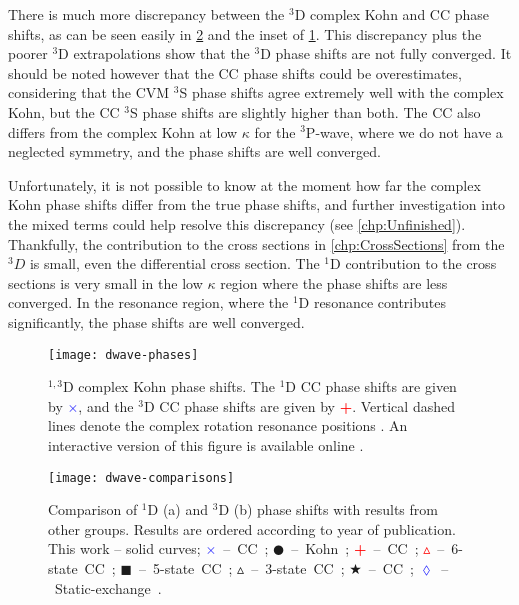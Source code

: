 \documentclass[Dissertation.tex]{subfiles}
\begin{document}
There is much more discrepancy between the $^3$D complex Kohn and CC phase
shifts, as can be seen easily in \cref{fig:DWaveComparisons} and the inset of
\cref{fig:DWavePhase}. This discrepancy
plus the poorer $^3$D extrapolations show that the $^3$D phase shifts are not
fully converged. It should be noted however that the CC phase shifts could be
overestimates, considering that the CVM \cite{Zhang2012} $^3$S phase shifts
agree extremely well with the complex Kohn, but the CC $^3$S phase shifts are
slightly higher than both. The CC also differs from the complex
Kohn at low $\kappa$ for the $^3$P-wave, where we do not have a neglected
symmetry, and the phase shifts are well converged.

Unfortunately, it is not possible to know at the moment how far the complex 
Kohn phase shifts differ from the true phase shifts, and further 
investigation into the mixed terms could help resolve this discrepancy
(see \cref{chp:Unfinished}). Thankfully, the contribution to the cross sections
in \cref{chp:CrossSections} from the $^3D$ is small, even the differential
cross section. The $^1$D contribution to the cross sections is very small
in the low $\kappa$ region where the phase shifts are less converged. In the
resonance region, where the $^1$D resonance contributes significantly, the
phase shifts are well converged.


\begin{figure}
	\centering
	\texttt{[image: dwave-phases]}
	\caption[$^{1,3}$D phase shifts]{$^{1,3}$D complex Kohn phase shifts. The $^1$D CC phase shifts
\cite{Walters2004} are given by \mbox{\textcolor{blue}{$\times$}}, and the
$^3$D CC phase shifts \cite{Blackwood2002} are given by
\mbox{\textcolor{red}{\textbf{+}}}. Vertical dashed lines denote the complex rotation resonance
positions \cite{Ho1998}. An interactive version of this figure is available online \cite{Plotly}.}
	\label{fig:DWavePhase}
\end{figure}

\begin{figure}
	\centering
	\texttt{[image: dwave-comparisons]}
	\caption[Comparison of D-wave phase shifts]{Comparison of $^1$D (a) and $^3$D (b) phase shifts with results from other groups. Results are ordered according to year of publication. This work -- solid curves; \mbox{\textcolor{blue}{$\times$} -- CC \cite{Walters2004};} \mbox{$\CIRCLE$ -- Kohn \cite{VanReeth2003};} \mbox{\textcolor{red}{\textbf{+}} -- CC \cite{Blackwood2002};} \mbox{\textcolor{red}{$\vartriangle$} -- 6-state CC \cite{Sinha2000};} \mbox{$\blacksquare$ -- 5-state CC \cite{Adhikari1999};} \mbox{$\vartriangle$ -- 3-state CC \cite{Sinha1997};} \mbox{\textcolor[RGB]{0,127,0}{$\bigstar$} -- CC \cite{Ray1997};} \mbox{\textcolor{blue}{$\lozenge$} -- Static-exchange \cite{Hara1975}.}}
	\label{fig:DWaveComparisons}
\end{figure}
\end{document}
